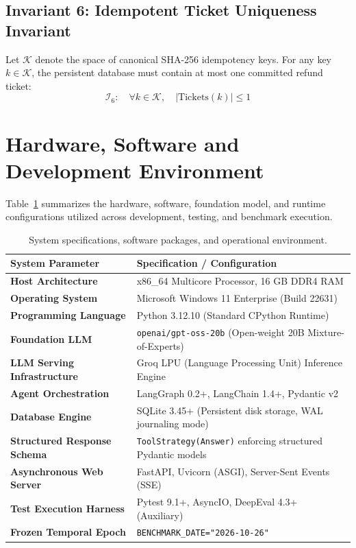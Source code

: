 \subsection{Invariant 6: Idempotent Ticket Uniqueness Invariant}
Let $\mathcal{K}$ denote the space of canonical SHA-256 idempotency keys. For any key $k \in \mathcal{K}$, the persistent database must contain at most one committed refund ticket:
\begin{equation}
    \mathcal{I}_6: \quad \forall k \in \mathcal{K}, \quad |\text{Tickets}(k)| \le 1
\end{equation}

\section{Hardware, Software and Development Environment}
\label{sec:req_env}
Table~\ref{tab:req_environment} summarizes the hardware, software, foundation model, and runtime configurations utilized across development, testing, and benchmark execution.

\begin{table}[H]
\centering
\small
\renewcommand{\arraystretch}{1.2}
\begin{tabularx}{\textwidth}{p{4.2cm}X}
\toprule
\textbf{System Parameter} & \textbf{Specification / Configuration} \\
\midrule
\textbf{Host Architecture} & x86\_64 Multicore Processor, 16 GB DDR4 RAM \\
\textbf{Operating System} & Microsoft Windows 11 Enterprise (Build 22631) \\
\textbf{Programming Language} & Python 3.12.10 (Standard CPython Runtime) \\
\textbf{Foundation LLM} & \texttt{openai/gpt-oss-20b} (Open-weight 20B Mixture-of-Experts) \\
\textbf{LLM Serving Infrastructure} & Groq LPU (Language Processing Unit) Inference Engine \\
\textbf{Agent Orchestration} & LangGraph 0.2+, LangChain 1.4+, Pydantic v2 \\
\textbf{Database Engine} & SQLite 3.45+ (Persistent disk storage, WAL journaling mode) \\
\textbf{Structured Response Schema} & \texttt{ToolStrategy(Answer)} enforcing structured Pydantic models \\
\textbf{Asynchronous Web Server} & FastAPI, Uvicorn (ASGI), Server-Sent Events (SSE) \\
\textbf{Test Execution Harness} & Pytest 9.1+, AsyncIO, DeepEval 4.3+ (Auxiliary) \\
\textbf{Frozen Temporal Epoch} & \texttt{BENCHMARK\_DATE="2026-10-26"} \\
\bottomrule
\end{tabularx}
\caption{System specifications, software packages, and operational environment.}
\label{tab:req_environment}
\end{table}
